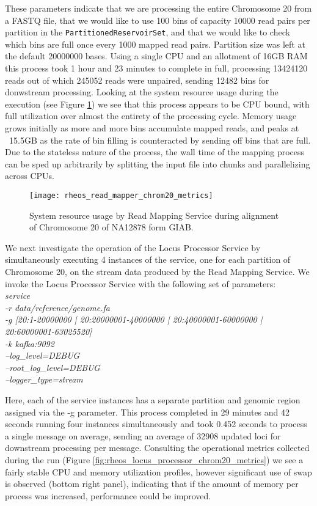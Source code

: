 These parameters indicate that we are processing the entire Chromosome 20 from a FASTQ file, that we would like to use 100 bins of capacity 10000 read pairs per partition in the \texttt{PartitionedReservoirSet}, and that we would like to check which bins are full once every 1000 mapped read pairs. Partition size was left at the default 20000000 bases. Using a single CPU and an allotment of 16GB RAM this process took 1 hour and 23 minutes to complete in full, processing 13424120 reads out of which 245052 reads were unpaired, sending 12482 bins for donwstream processing. Looking at the system resource usage during the execution (see Figure \ref{fig:rheos_read_mapper_chrom20_metrics}) we see that this process appears to be CPU bound, with full utilization over almost the entirety of the processing cycle. Memory usage grows initially as more and more bins accumulate mapped reads, and peaks at ~15.5GB as the rate of bin filling is counteracted by sending off bins that are full. Due to the stateless nature of the process, the wall time of the mapping process can be sped up arbitrarily by splitting the input file into chunks and parallelizing across CPUs.

\begin{figure}[h!]
    \texttt{[image: rheos\_read\_mapper\_chrom20\_metrics]}
    \centering
    \caption {System resource usage by Read Mapping Service during alignment of Chromosome 20 of NA12878 form GIAB.}
    \label{fig:rheos_read_mapper_chrom20_metrics}
\end{figure}

We next investigate the operation of the Locus Processor Service by simultaneously executing 4 instances of the service, one for each partition of Chromosome 20, on the stream data produced by the Read Mapping Service. We invoke the Locus Processor Service with the following set of parameters:
\\
\emph{
    service\\
-r data/reference/genome.fa\\
-g [20:1-20000000 | 20:20000001-40000000 | 20:40000001-60000000 | 20:60000001-63025520]\\
-k kafka:9092\\
--log\_level=DEBUG\\
--root\_log\_level=DEBUG\\
--logger\_type=stream\\
}

Here, each of the service instances has a separate partition and genomic region assigned via the -g parameter. This process completed in 29 minutes and 42 seconds running four instances simultaneously and took 0.452 seconds to process a single message on average, sending an average of 32908 updated loci for downstream processing per message. Consulting the operational metrics collected during the run (Figure \ref{fig:rheos_locus_processor_chrom20_metrics}) we see a fairly stable CPU and memory utilization profiles, however significant use of swap is observed (bottom right panel), indicating that if the amount of memory per process was increased, performance could be improved.


